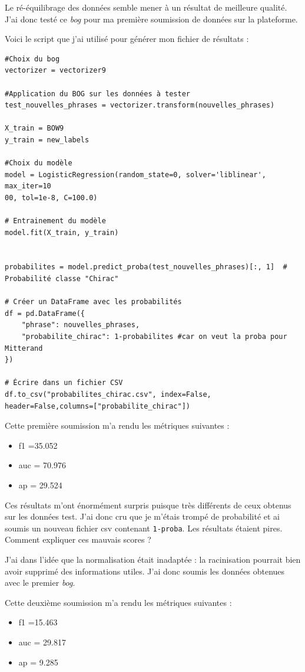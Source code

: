 \documentclass[a4paper,12pt]{article}
\begin{document}
Le ré-équilibrage des données semble mener à un résultat de meilleure qualité. J'ai donc testé ce \textit{bog} pour ma première soumission de données sur la plateforme.

Voici le script que j'ai utilisé pour générer mon fichier de résultats :

\begin{lstlisting}
#Choix du bog
vectorizer = vectorizer9 

#Application du BOG sur les données à tester
test_nouvelles_phrases = vectorizer.transform(nouvelles_phrases)

X_train = BOW9
y_train = new_labels

#Choix du modèle
model = LogisticRegression(random_state=0, solver='liblinear', max_iter=10
00, tol=1e-8, C=100.0)

# Entrainement du modèle
model.fit(X_train, y_train)


probabilites = model.predict_proba(test_nouvelles_phrases)[:, 1]  # Probabilité classe "Chirac"

# Créer un DataFrame avec les probabilités
df = pd.DataFrame({
    "phrase": nouvelles_phrases,
    "probabilite_chirac": 1-probabilites #car on veut la proba pour Mitterand
})

# Écrire dans un fichier CSV
df.to_csv("probabilites_chirac.csv", index=False, header=False,columns=["probabilite_chirac"])
\end{lstlisting}

Cette première soumission m'a rendu les métriques suivantes :
\begin{itemize}
\item f1 =35.052
\item auc = 70.976
\item ap = 29.524
\end{itemize}

Ces résultats m'ont énormément surpris puisque très différents de ceux obtenus sur les données test. J'ai donc cru que je m'étais trompé de probabilité et ai soumis un nouveau fichier csv contenant \texttt{1-proba}. Les résultats étaient pires. Comment expliquer ces mauvais scores ?

J'ai dans l'idée que la normalisation était inadaptée : la racinisation pourrait bien avoir supprimé des informations utiles. J'ai donc soumis les données obtenues avec le premier \textit{bog}.

Cette deuxième soumission m'a rendu les métriques suivantes :
\begin{itemize}
\item f1 =15.463
\item auc = 29.817
\item ap = 9.285
\end{itemize}
\end{document}
